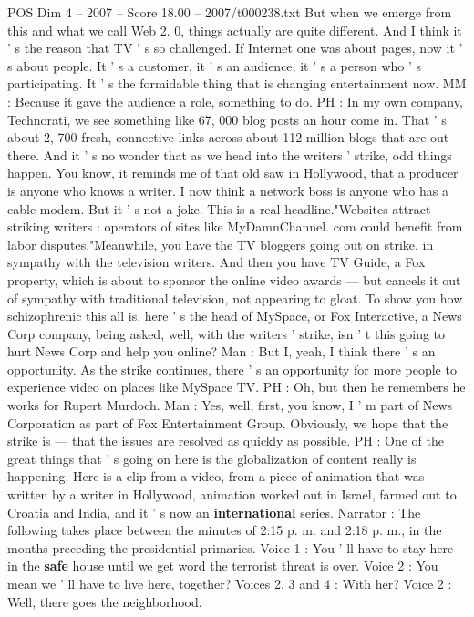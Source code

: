 \begin{textsample}{POS Dim 4 – 2007 – Score 18.00 – 2007/t000238.txt}
But when we emerge from this and what we call Web 2. 0, things actually are quite different.
And I think it ' s the reason that TV ' s so challenged.
If Internet one was about pages, now it ' s about people.
It ' s a customer, it ' s an audience, it ' s a person who ' s participating.
It ' s the formidable thing that is changing entertainment now.
MM : Because it gave the audience a role, something to do.
PH : In my own company, Technorati, we see something like 67, 000 blog posts an hour come in.
That ' s about 2, 700 fresh, connective links across about 112 million blogs that are out there.
And it ' s no wonder that as we head into the writers ' strike, odd things happen.
You know, it reminds me of that old saw in Hollywood, that a producer is anyone who knows a writer.
I now think a network boss is anyone who has a cable modem.
But it ' s not a joke.
This is a real headline."Websites attract striking writers : operators of sites like MyDamnChannel. com could benefit from labor disputes."Meanwhile, you have the TV bloggers going out on strike, in sympathy with the television writers.
And then you have TV Guide, a Fox property, which is about to sponsor the online video awards — but cancels it out of sympathy with traditional television, not appearing to gloat.
To show you how schizophrenic this all is, here ' s the head of MySpace, or Fox Interactive, a News Corp company, being asked, well, with the writers ' strike, isn ' t this going to hurt News Corp and help you online?
Man : But I, yeah, I think there ' s an opportunity.
As the strike continues, there ' s an opportunity for more people to experience video on places like MySpace TV.
PH : Oh, but then he remembers he works for Rupert Murdoch.
Man : Yes, well, first, you know, I ' m part of News Corporation as part of Fox Entertainment Group.
Obviously, we hope that the strike is — that the issues are resolved as quickly as possible.
PH : One of the great things that ' s going on here is the globalization of content really is happening.
Here is a clip from a video, from a piece of animation that was written by a writer in Hollywood, animation worked out in Israel, farmed out to Croatia and India, and it ' s now an \textbf{international} series.
Narrator : The following takes place between the minutes of 2:15 p. m. and 2:18 p. m., in the months preceding the presidential primaries.
Voice 1 : You ' ll have to stay here in the \textbf{safe} house until we get word the terrorist threat is over.
Voice 2 : You mean we ' ll have to live here, together?
Voices 2, 3 and 4 : With her?
Voice 2 : Well, there goes the neighborhood.

\end{textsample}
